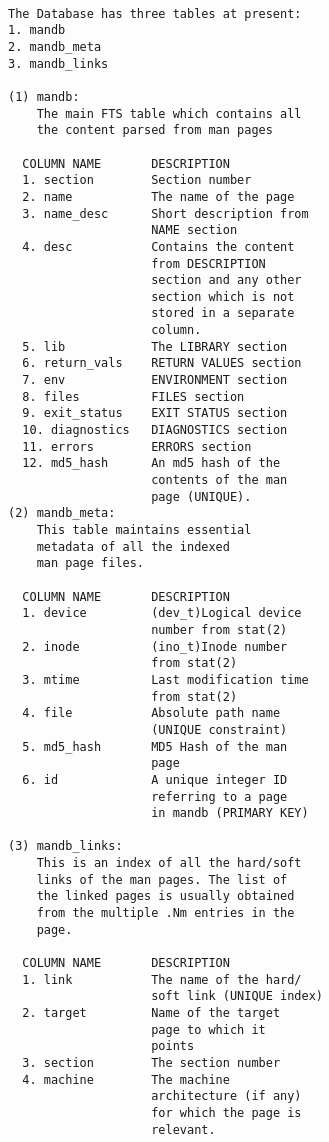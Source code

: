 \documentclass[letterpaper,twocolumn,10pt]{article}
\begin{document}
{\tt \small
{}
\begin{lstlisting}
The Database has three tables at present:
1. mandb
2. mandb_meta
3. mandb_links

(1) mandb:
    The main FTS table which contains all
    the content parsed from man pages

  COLUMN NAME       DESCRIPTION
  1. section        Section number
  2. name           The name of the page  
  3. name_desc      Short description from
                    NAME section  
  4. desc           Contains the content
                    from DESCRIPTION
                    section and any other
                    section which is not
                    stored in a separate
                    column.
  5. lib            The LIBRARY section
  6. return_vals    RETURN VALUES section
  7. env            ENVIRONMENT section
  8. files          FILES section
  9. exit_status    EXIT STATUS section
  10. diagnostics   DIAGNOSTICS section
  11. errors        ERRORS section
  12. md5_hash      An md5 hash of the
                    contents of the man
                    page (UNIQUE).
(2) mandb_meta:
    This table maintains essential
    metadata of all the indexed
    man page files.

  COLUMN NAME       DESCRIPTION
  1. device         (dev_t)Logical device
                    number from stat(2)
  2. inode          (ino_t)Inode number
                    from stat(2)
  3. mtime          Last modification time
                    from stat(2)
  4. file           Absolute path name
                    (UNIQUE constraint)
  5. md5_hash       MD5 Hash of the man
                    page
  6. id             A unique integer ID
                    referring to a page
                    in mandb (PRIMARY KEY)

(3) mandb_links:
    This is an index of all the hard/soft
    links of the man pages. The list of
    the linked pages is usually obtained 
    from the multiple .Nm entries in the
    page.

  COLUMN NAME       DESCRIPTION
  1. link           The name of the hard/
                    soft link (UNIQUE index) 
  2. target         Name of the target
                    page to which it
                    points  
  3. section        The section number  
  4. machine        The machine
                    architecture (if any)
                    for which the page is
                    relevant.
\end{lstlisting}
}
\end{document}
